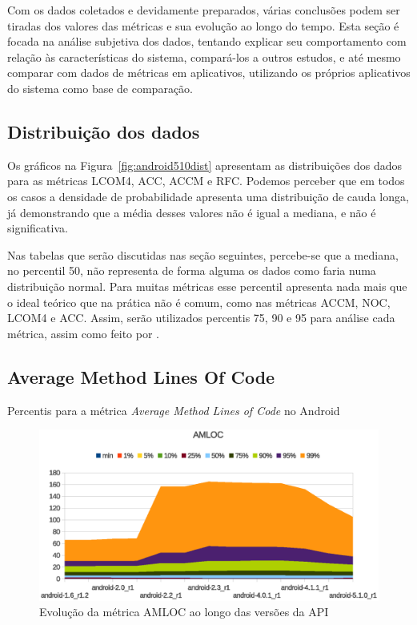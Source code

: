 Com os dados coletados e devidamente preparados, várias conclusões podem ser tiradas dos valores das métricas e sua evolução ao longo do tempo. Esta seção é focada na análise subjetiva dos dados, tentando explicar seu comportamento com relação às características do sistema, compará-los a outros estudos, e até mesmo comparar com dados de métricas em aplicativos, utilizando os próprios aplicativos do sistema como base de comparação.


\subsection{Distribuição dos dados}

Os gráficos na Figura~\ref{fig:android510dist} apresentam as distribuições dos dados para as métricas LCOM4, ACC, ACCM e RFC. Podemos perceber que em todos os casos a densidade de probabilidade apresenta uma distribuição de cauda longa, já demonstrando que a média desses valores não é igual a mediana, e não é significativa. 

Nas tabelas que serão discutidas nas seção seguintes, percebe-se que a mediana, no percentil 50, não representa de forma alguma os dados como faria numa distribuição normal. Para muitas métricas esse percentil apresenta nada mais que o ideal teórico que na prática não é comum, como nas métricas ACCM, NOC, LCOM4 e ACC. Assim, serão utilizados percentis 75, 90 e 95 para análise cada métrica, assim como feito por . 

\subsection{Average Method Lines Of Code}

\begin{table}[!htb]

\caption{Percentis para a métrica \textit{Average Method Lines of Code} no Android}
\label{tab:amloc_android}
\end{table}

\begin{figure}[!htb]
\centering
\includegraphics [keepaspectratio=true,scale=0.85]{figuras/graphs/amloc_android.eps}
\caption{Evolução da métrica AMLOC ao longo das versões da API}
\label{fig:amloc_android}
\end{figure}


